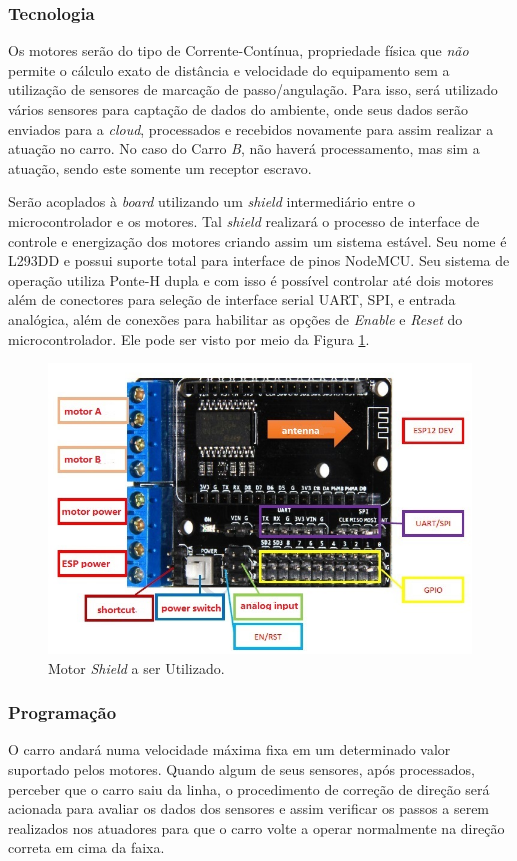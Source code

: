 \documentclass[portugues, brazil, a4paper,12pt]{article}
\begin{document}
		\subsubsection{Tecnologia}
			Os motores serão do tipo de Corrente-Contínua, propriedade física que \emph{não} permite o cálculo exato de distância e velocidade do equipamento sem a utilização de sensores de marcação de passo/angulação. Para isso, será utilizado vários sensores para captação de dados do ambiente, onde seus dados serão enviados para a \textit{cloud}, processados e recebidos novamente para assim realizar a atuação no carro. No caso do Carro \textit{B}, não haverá processamento, mas sim a atuação, sendo este somente um receptor escravo.

			Serão acoplados à \textit{board} utilizando um \textit{shield} intermediário entre o microcontrolador e os motores. Tal \textit{shield} realizará o processo de interface de controle e energização dos motores criando assim um sistema estável. Seu nome é L293DD e possui suporte total para interface de pinos NodeMCU. Seu sistema de operação utiliza Ponte-H dupla e com isso é possível controlar até dois motores além de conectores para seleção de interface serial UART, SPI, e entrada analógica, além de conexões para habilitar as opções de \textit{Enable} e \textit{Reset} do microcontrolador. Ele pode ser visto por meio da Figura \ref{fig:eq-motor_shield}.

			\begin{figure}[H]
				\centering
				\includegraphics[width=0.9\linewidth]{img/elementos-motor_shield.jpg}
				\caption{Motor \textit{Shield} a ser Utilizado.}
				\label{fig:eq-motor_shield}
			\end{figure}

		\subsubsection{Programação}
			O carro andará numa velocidade máxima fixa em um determinado valor suportado pelos motores. Quando algum de seus sensores, após processados, perceber que o carro saiu da linha, o procedimento de correção de direção será acionada para avaliar os dados dos sensores e assim verificar os passos a serem realizados nos atuadores para que o carro volte a operar normalmente na direção correta em cima da faixa.
\end{document}

